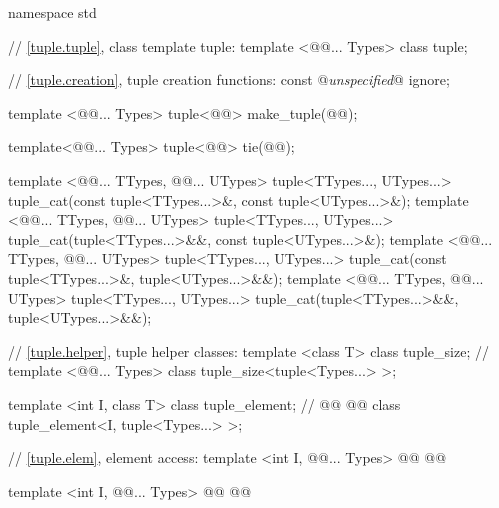 \documentclass[american,twoside]{book}
\begin{document}
\pnum
{}

%
\begin{codeblock}
namespace std {
  // \ref{tuple.tuple}, class template tuple:
  template <@@... Types> class tuple;

  // \ref{tuple.creation}, tuple creation functions:
  const @\textit{unspecified}@ ignore;

  template <@@... Types>
    tuple<@@> make_tuple(@@);

  template<@@... Types>
    tuple<@@> tie(@@); 

  template <@@... TTypes, @@... UTypes>
    tuple<TTypes..., UTypes...> tuple_cat(const tuple<TTypes...>&, const tuple<UTypes...>&);
  template <@@... TTypes, @@... UTypes>
    tuple<TTypes..., UTypes...> tuple_cat(tuple<TTypes...>&&, const tuple<UTypes...>&);
  template <@@... TTypes, @@... UTypes>
    tuple<TTypes..., UTypes...> tuple_cat(const tuple<TTypes...>&, tuple<UTypes...>&&);
  template <@@... TTypes, @@... UTypes>
    tuple<TTypes..., UTypes...> tuple_cat(tuple<TTypes...>&&, tuple<UTypes...>&&);

  // \ref{tuple.helper}, tuple helper classes:
  template <class T> class tuple_size;  // 
  template <@@... Types> class tuple_size<tuple<Types...> >;

  template <int I, class T> class tuple_element;    // 
  @@ 
    @@ class tuple_element<I, tuple<Types...> >;

  // \ref{tuple.elem}, element access:
  template <int I, @@... Types> 
    @@
    @@

  template <int I, @@... Types>
    @@
    @@

}
\end{codeblock}
\end{document}
